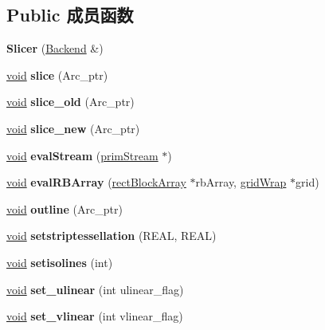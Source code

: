 \subsection*{Public 成员函数}
\begin{DoxyCompactItemize}
\item 
\mbox{\label{class_slicer_a366636c1d6efde5e997f14bcf8e0e1da}} 
{\bfseries Slicer} (\hyperlink{class_backend}{Backend} \&)
\item 
\mbox{\label{class_slicer_af53fff91ee74e9fdcdab8298a743c8c4}} 
\hyperlink{interfacevoid}{void} {\bfseries slice} (Arc\+\_\+ptr)
\item 
\mbox{\label{class_slicer_af29cf8ba9439380ca47a167fae2246db}} 
\hyperlink{interfacevoid}{void} {\bfseries slice\+\_\+old} (Arc\+\_\+ptr)
\item 
\mbox{\label{class_slicer_a0bd105cf23f4c97b34273fba1cc4818d}} 
\hyperlink{interfacevoid}{void} {\bfseries slice\+\_\+new} (Arc\+\_\+ptr)
\item 
\mbox{\label{class_slicer_a2c21305addad94e1b5495b63156e26ed}} 
\hyperlink{interfacevoid}{void} {\bfseries eval\+Stream} (\hyperlink{classprim_stream}{prim\+Stream} $\ast$)
\item 
\mbox{\label{class_slicer_abfd65df042df6e10e0c764278f627d24}} 
\hyperlink{interfacevoid}{void} {\bfseries eval\+R\+B\+Array} (\hyperlink{classrect_block_array}{rect\+Block\+Array} $\ast$rb\+Array, \hyperlink{classgrid_wrap}{grid\+Wrap} $\ast$grid)
\item 
\mbox{\label{class_slicer_a334ced3f397d1c9871e2831e910dc52c}} 
\hyperlink{interfacevoid}{void} {\bfseries outline} (Arc\+\_\+ptr)
\item 
\mbox{\label{class_slicer_af31eb7851489ccdb5cb85cf242ca0e8f}} 
\hyperlink{interfacevoid}{void} {\bfseries setstriptessellation} (R\+E\+AL, R\+E\+AL)
\item 
\mbox{\label{class_slicer_aec2ecb7c97ef099ca87234ad1c90d81c}} 
\hyperlink{interfacevoid}{void} {\bfseries setisolines} (int)
\item 
\mbox{\label{class_slicer_a87940b439a76dd18631ad70300634f9b}} 
\hyperlink{interfacevoid}{void} {\bfseries set\+\_\+ulinear} (int ulinear\+\_\+flag)
\item 
\mbox{\label{class_slicer_a8fcb0d0b4f2ee53ef810cae5217638c8}} 
\hyperlink{interfacevoid}{void} {\bfseries set\+\_\+vlinear} (int vlinear\+\_\+flag)
\end{DoxyCompactItemize}
